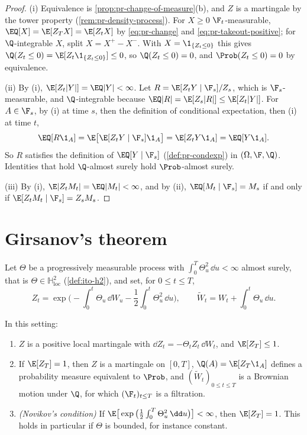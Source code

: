 \begin{proof}
(i) Equivalence is \cref{prop:pr-change-of-measure}(b), and $Z$ is a martingale by the tower
property (\cref{rem:pr-density-process}). For $X\ge0$ $\F_t$-measurable,
$\EQ[X]=\E[Z_TX]=\E[Z_tX]$ by \eqref{eq:pr-change} and \eqref{eq:pr-takeout-positive}; for
$\Q$-integrable $X$, split $X=X^+-X^-$. With $X=\1_{\{Z_t\le0\}}$ this gives
$\Q(Z_t\le0)=\E[Z_t\1_{\{Z_t\le0\}}]\le0$, so $\Q(Z_t\le0)=0$, and $\Prob(Z_t\le0)=0$ by
equivalence.

(ii) By (i), $\E[Z_t|Y|]=\EQ|Y|<\infty$. Let $R=\E[Z_tY\mid\F_s]/Z_s$, which is
$\F_s$-measurable, and $\Q$-integrable because $\EQ|R|=\E[Z_s|R|]\le\E[Z_t|Y|]$. For
$A\in\F_s$, by (i) at time $s$, then the definition of conditional expectation, then (i) at
time $t$,
\[
  \EQ[R\1_A]=\E\big[\E[Z_tY\mid\F_s]\1_A\big]=\E[Z_tY\1_A]=\EQ[Y\1_A].
\]
So $R$ satisfies the definition of $\EQ[Y\mid\F_s]$ (\cref{def:pr-condexp}) in
$(\Omega,\F,\Q)$. Identities that hold $\Q$-almost surely hold $\Prob$-almost surely.

(iii) By (i), $\E|Z_tM_t|=\EQ|M_t|<\infty$, and by (ii), $\EQ[M_t\mid\F_s]=M_s$ if and only if
$\E[Z_tM_t\mid\F_s]=Z_sM_s$.
\end{proof}

\section{Girsanov's theorem}\label{sec:rn-girsanov}

Let $\Theta$ be a progressively measurable process with $\int_0^T\Theta_u^2\,\dd u<\infty$
almost surely, that is $\Theta\in\mathbb H^2_{\mathrm{loc}}$ (\cref{def:ito-h2}), and set,
for $0\le t\le T$,
\begin{equation}\label{eq:rn-girsanov}
  Z_t=\exp\Big(-\int_0^t\Theta_u\,\dd W_u-\frac12\int_0^t\Theta_u^2\,\dd u\Big),\qquad
  \widetilde W_t=W_t+\int_0^t\Theta_u\,\dd u .
\end{equation}

\begin{theorem}\label{thm:rn-girsanov}
In this setting:
\begin{enumerate}[label=(\roman*)]
  \item $Z$ is a positive local martingale with $\dd Z_t=-\Theta_tZ_t\,\dd W_t$, and
    $\E[Z_T]\le1$.
  \item If $\E[Z_T]=1$, then $Z$ is a martingale on $[0,T]$, $\Q(A)=\E[Z_T\1_A]$ defines a
    probability measure equivalent to $\Prob$, and $(\widetilde W_t)_{0\le t\le T}$ is a
    Brownian motion under $\Q$, for which $(\F_t)_{t\le T}$ is a filtration.
  \item \emph{(Novikov's condition)} If $\E\big[\exp\big(\frac12\int_0^T\Theta_u^2\,\dd
    u\big)\big]<\infty$, then $\E[Z_T]=1$. This holds in particular if $\Theta$ is bounded,
    for instance constant.
\end{enumerate}
\end{theorem}

